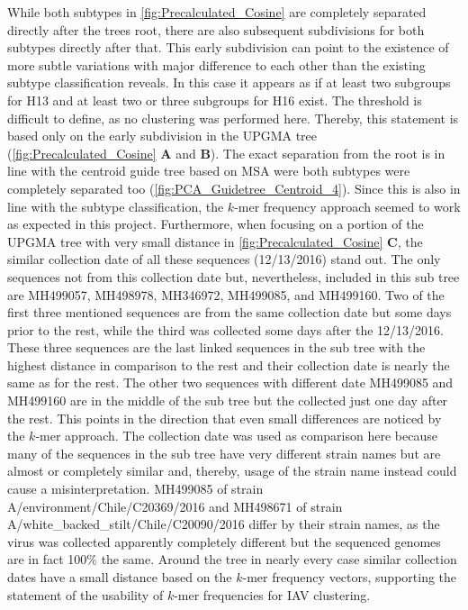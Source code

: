 While both subtypes in \autoref{fig:Precalculated_Cosine} are completely separated directly after the trees root, there are also subsequent subdivisions for both subtypes directly after that. This early subdivision can point to the existence of more subtle variations with major difference to each other than the existing subtype classification reveals. In this case it appears as if at least two subgroups for H13 and at least two or three subgroups for H16 exist. The threshold is difficult to define, as no clustering was performed here. Thereby, this statement is based only on the early subdivision in the \gls{UPGMA} tree (\autoref{fig:Precalculated_Cosine} \textbf{\textsf{A}} and \textbf{\textsf{B}}). The exact separation from the root is in line with the centroid guide tree based on \gls{MSA} were both subtypes were completely separated too (\autoref{fig:PCA_Guidetree_Centroid_4}). Since this is also in line with the subtype classification, the $k$-mer frequency approach seemed to work as expected in this project. Furthermore, when focusing on a portion of the \gls{UPGMA} tree with very small distance in \autoref{fig:Precalculated_Cosine} \textbf{\textsf{C}}, the similar collection date of all these sequences (12/13/2016) stand out. The only sequences not from this collection date but, nevertheless, included in this sub tree are MH499057, MH498978, MH346972, MH499085, and MH499160. Two of the first three mentioned sequences are from the same collection date but some days prior to the rest, while the third was collected some days after the 12/13/2016. These three sequences are the last linked sequences in the sub tree with the highest distance in comparison to the rest and their collection date is nearly the same as for the rest. The other two sequences with different date MH499085 and MH499160 are in the middle of the sub tree but the collected just one day after the rest. This points in the direction that even small differences are noticed by the $k$-mer approach. The collection date was used as comparison here because many of the sequences in the sub tree have very different strain names but are almost or completely similar and, thereby, usage of the strain name instead could cause a misinterpretation. MH499085 of strain A/environment/Chile/C20369/2016 and MH498671 of strain A/white\_backed\_stilt/Chile/C20090/2016 differ by their strain names, as the virus was collected apparently completely different but the sequenced genomes are in fact 100\% the same. Around the tree in nearly every case similar collection dates have a small distance based on the $k$-mer frequency vectors, supporting the statement of the usability of $k$-mer frequencies for \gls{IAV} clustering. %

